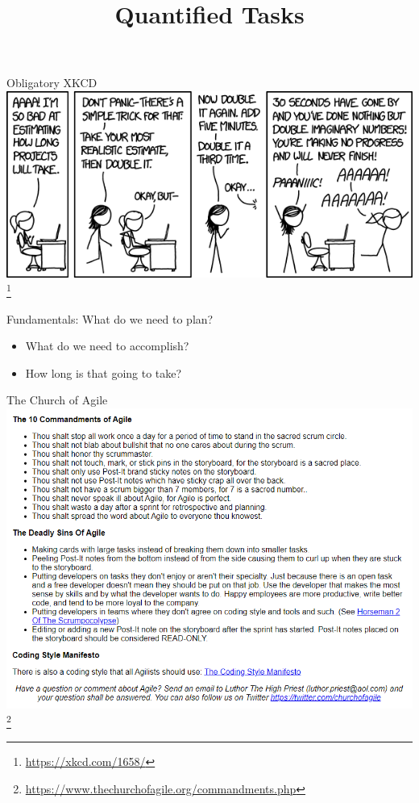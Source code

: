 \documentclass[aspectratio=169]{beamer}
\title{Quantified Tasks}
\institute{Engineers for Exploration, UC San Diego}
\begin{document}
\maketitle
\begin{frame}{Obligatory XKCD}
    \centering
    \includegraphics[width=\textwidth,height=0.7\textheight,keepaspectratio]{xkcd_1658.png} \footnote{\url{https://xkcd.com/1658/}}
\end{frame}
\begin{frame}{Fundamentals: What do we need to plan?}
    \begin{itemize}
        \item What do we need to accomplish?
        \item How long is that going to take?
    \end{itemize}
\end{frame}
\begin{frame}{The Church of Agile}
    \centering
    \includegraphics[width=\textwidth,height=0.8\textheight,keepaspectratio]{church_of_agile_10_commandments.png} \footnote{\url{https://www.thechurchofagile.org/commandments.php}}
\end{frame}
\end{document}
